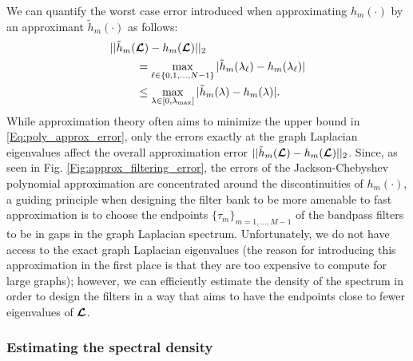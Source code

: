 \documentclass[journal, 10pt]{IEEEtran}
\begin{document}
We can quantify the worst case error introduced when approximating  $h_m(\cdot)$ by an approximant $\tilde{h}_m(\cdot)$ as follows:
\begin{align} \label{Eq:poly_approx_error}
&||\tilde{h}_m(\L)-h_m(\L) ||_2  \nonumber \\ &~~~~~~~= \max_{\l \in \{0,1,\ldots,N-1\}}|\tilde{h}_m(\lambda_{\l})-h_m(\lambda_{\l}) |  \nonumber \\
 &~~~~~~~\leq \max_{\lambda \in [0,\lambda_{\max}]}|\tilde{h}_m(\lambda)-h_m(\lambda) |.
\end{align}
While approximation theory often aims to minimize the upper bound in \eqref{Eq:poly_approx_error}, only the errors exactly at the graph Laplacian eigenvalues affect the overall approximation error $||\tilde{h}_m(\boldsymbol{\mathcal{L}})-h_m(\boldsymbol{\mathcal{L}}) ||_2$. Since, as seen in Fig. \ref{Fig:approx_filtering_error}, the errors of the Jackson-Chebyshev polynomial approximation are concentrated around the discontinuities of $h_m(\cdot)$, a guiding principle when designing the filter bank to be more amenable to fast approximation is to choose the endpoints $\{\tau_m\}_{m=1,\ldots,M-1}$ of the bandpass filters to be in gaps in the graph Laplacian spectrum. Unfortunately, we do not have access to the exact graph Laplacian eigenvalues (the reason for introducing this approximation in the first place is that they are too expensive to compute for large graphs); however, we can efficiently estimate the density of the spectrum in order to design the filters in a way that aims to have the endpoints close to fewer eigenvalues of $\boldsymbol{\mathcal{L}}$.

\subsubsection{Estimating the spectral density} \label{Se:spectral_density}
\end{document}
